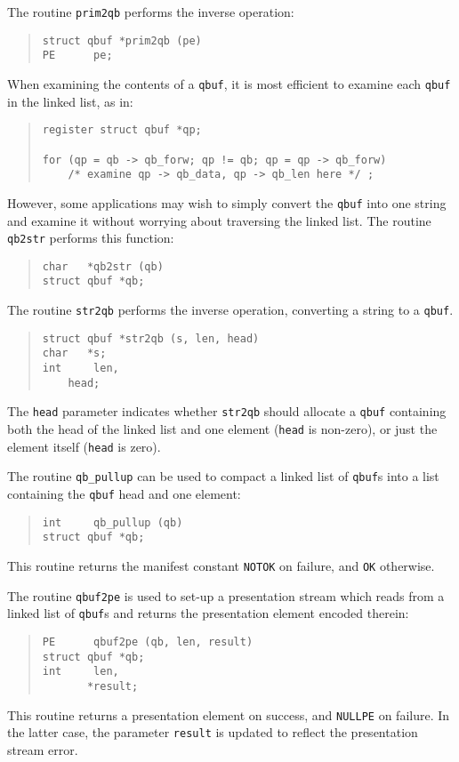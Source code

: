 The routine \verb"prim2qb" performs the inverse operation:
\begin{quote}\small\begin{verbatim}
struct qbuf *prim2qb (pe)
PE      pe;
\end{verbatim}\end{quote}

When examining the contents of a \verb"qbuf",
it is most efficient to examine each \verb"qbuf" in the linked list,
as in:
\begin{quote}\small\begin{verbatim}
register struct qbuf *qp;

for (qp = qb -> qb_forw; qp != qb; qp = qp -> qb_forw)
    /* examine qp -> qb_data, qp -> qb_len here */ ;
\end{verbatim}\end{quote}
However,
some applications may wish to simply convert the \verb"qbuf" into one string
and examine it without worrying about traversing the linked list.
The routine \verb"qb2str" performs this function:
\begin{quote}\small\begin{verbatim}
char   *qb2str (qb)
struct qbuf *qb;
\end{verbatim}\end{quote}
The routine \verb"str2qb" performs the inverse operation,
converting a string to a \verb"qbuf".
\begin{quote}\small\begin{verbatim}
struct qbuf *str2qb (s, len, head)
char   *s;
int     len,
	head;
\end{verbatim}\end{quote}
The \verb"head" parameter indicates whether \verb"str2qb" should allocate a
\verb"qbuf" containing both the head of the linked list and one element
(\verb"head" is non-zero),
or just the element itself (\verb"head" is zero).

The routine \verb"qb_pullup" can be used to compact a linked list of
\verb"qbuf"s into a list containing the \verb"qbuf" head and one element:
\begin{quote}\small\begin{verbatim}
int     qb_pullup (qb)
struct qbuf *qb;
\end{verbatim}\end{quote}
This routine returns the manifest constant \verb"NOTOK" on failure,
and \verb"OK" otherwise.

The routine \verb"qbuf2pe" is used to set-up a presentation stream which reads
from a linked list of \verb"qbuf"s and returns the presentation element
encoded therein:
\begin{quote}\small\begin{verbatim}
PE      qbuf2pe (qb, len, result)
struct qbuf *qb;
int     len,
       *result;
\end{verbatim}\end{quote}
This routine returns a presentation element on success,
and \verb"NULLPE" on failure.
In the latter case, the parameter \verb"result" is updated to reflect the
presentation stream error.

